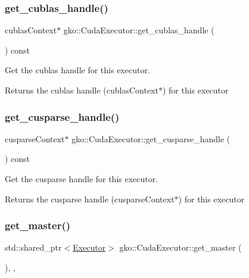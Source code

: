 \subsubsection{\texorpdfstring{get\+\_\+cublas\+\_\+handle()}{get\_cublas\_handle()}}
{\footnotesize\ttfamily cublas\+Context$\ast$ gko\+::\+Cuda\+Executor\+::get\+\_\+cublas\+\_\+handle (\begin{DoxyParamCaption}{ }\end{DoxyParamCaption}) const\hspace{0.3cm}{\ttfamily [inline]}}



Get the cublas handle for this executor. 

\begin{DoxyReturn}{Returns}
the cublas handle (cublas\+Context$\ast$) for this executor 
\end{DoxyReturn}
\mbox{\label{classgko_1_1CudaExecutor_ade84197157cc2695e5c94310692ab323}} 
\subsubsection{\texorpdfstring{get\+\_\+cusparse\+\_\+handle()}{get\_cusparse\_handle()}}
{\footnotesize\ttfamily cusparse\+Context$\ast$ gko\+::\+Cuda\+Executor\+::get\+\_\+cusparse\+\_\+handle (\begin{DoxyParamCaption}{ }\end{DoxyParamCaption}) const\hspace{0.3cm}{\ttfamily [inline]}}



Get the cusparse handle for this executor. 

\begin{DoxyReturn}{Returns}
the cusparse handle (cusparse\+Context$\ast$) for this executor 
\end{DoxyReturn}
\mbox{\label{classgko_1_1CudaExecutor_a59a618e0d48b42fe699e9d4cf347b491}} 
\subsubsection{\texorpdfstring{get\+\_\+master()}{get\_master()}\hspace{0.1cm}{\footnotesize\ttfamily [1/2]}}
{\footnotesize\ttfamily std\+::shared\+\_\+ptr$<$\hyperlink{classgko_1_1Executor}{Executor}$>$ gko\+::\+Cuda\+Executor\+::get\+\_\+master (\begin{DoxyParamCaption}{ }\end{DoxyParamCaption})\hspace{0.3cm}{\ttfamily [override]}, {\ttfamily [virtual]}, {\ttfamily [noexcept]}}




